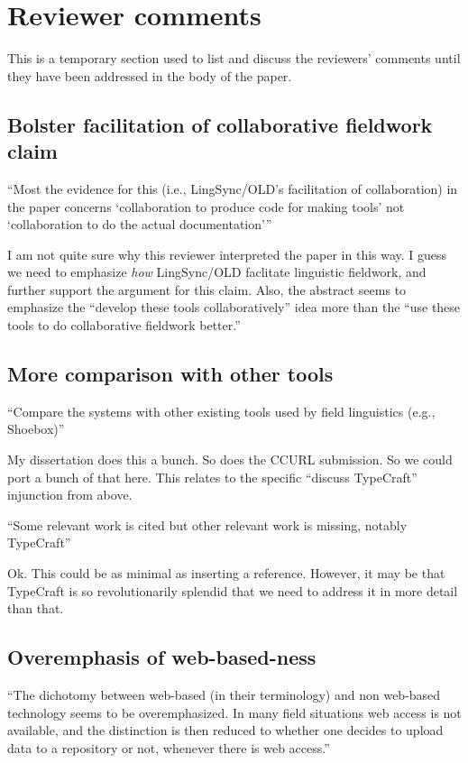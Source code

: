 \documentclass[11pt]{article}
\begin{document}
\section{Reviewer comments}

This is a temporary section used to list and discuss the reviewers' comments
until they have been addressed in the body of the paper.


\subsection{Bolster facilitation of collaborative fieldwork claim}

``Most the evidence for this (i.e., LingSync/OLD's facilitation of
collaboration) in the paper concerns `collaboration to produce code for
making tools' not `collaboration to do the actual documentation'{}''

I am not quite sure why this reviewer interpreted the paper in this way.
I guess we need to emphasize \textit{how} LingSync/OLD faclitate linguistic
fieldwork, and further support the argument for this claim. Also, the
abstract seems to emphasize the ``develop these tools collaboratively''
idea more than the ``use these tools to do collaborative fieldwork better.''


\subsection{More comparison with other tools}

``Compare the systems with other existing tools used by field linguistics
(e.g., Shoebox)''

My dissertation does this a bunch. So does the CCURL submission. So we could
port a bunch of that here. This relates to the specific ``discuss TypeCraft''
injunction from above.

``Some relevant work is cited but other relevant work is missing, notably
TypeCraft''

Ok. This could be as minimal as inserting a reference. However, it may be that
TypeCraft is so revolutionarily splendid that we need to address it in more
detail than that.


\subsection{Overemphasis of web-based-ness}

``The dichotomy between web-based (in their terminology) and non web-based
technology seems to be overemphasized. In many field situations web access is
not available, and the distinction is then reduced to whether one decides
to upload data to a repository or not, whenever there is web access.''
\end{document}

